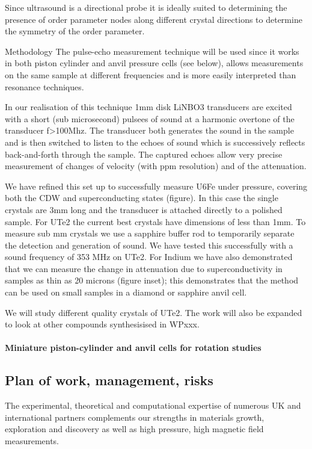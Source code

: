 Since ultrasound is a directional probe it is ideally suited to determining the presence of order parameter nodes along different crystal directions to determine the symmetry of the order parameter.

Methodology
The pulse-echo measurement technique will be used since it works in both piston cylinder and anvil pressure cells (see below), allows measurements on the same sample at different frequencies and is more easily interpreted than resonance techniques.

In our realisation of this technique 1mm disk LiNBO3 transducers are excited with a short (sub microsecond) pulsees of sound at a harmonic overtone of the transducer f>100Mhz. The transducer both generates the sound in the sample and is then switched to listen to the echoes of sound which is successively reflects back-and-forth through the sample. The captured echoes allow very precise measurement of changes of velocity (with ppm resolution) and of the attenuation.

We have refined this set up to successfully measure U6Fe under pressure, covering both the CDW and superconducting states (figure). In this case the single crystals are 3mm long and the transducer is attached directly to a polished sample. For UTe2 the current best crystals have dimensions of less than 1mm. To measure sub mm crystals we use a sapphire buffer rod to temporarily separate the detection and generation of sound. We have tested this successfully with a sound frequency of 353 MHz on UTe2. For Indium we have also demonstrated that we can measure the change in attenuation due to superconductivity in samples as thin as 20 microns (figure inset); this demonstrates that the method can be used on small samples in a diamond or sapphire anvil cell.

We will study different quality crystals of UTe2.  The work will also be expanded to look at other compounds synthesisised in WPxxx. 
\paragraph{Miniature piston-cylinder and anvil cells for rotation studies}

\subsection*{Plan of work, management,
risks}
\noindent
The experimental, theoretical and computational expertise of numerous UK and international partners complements our strengths in materials growth, exploration and discovery as well as high pressure, high magnetic field measurements. 

